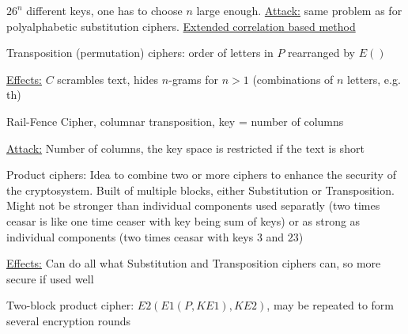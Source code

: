 \documentclass[landscape, a4paper]{article}
\begin{document}
\begin{minipage}[t]{0.2\linewidth}
\begin{betterlist}
\begin{betterlist}
\begin{betterlist}
				\begin{betterlist}
					\item $26^n$ different keys, one has to choose $n$ large enough. \underline{Attack:} same problem as for polyalphabetic substitution ciphers. \underline{Extended correlation based method}
				\end{betterlist}
			\end{betterlist}
		\end{betterlist}
	\end{betterlist}
	\begin{betterlist}
		\item \alert{Transposition (permutation) ciphers:} order of letters in $P$ rearranged by $E()$
		\begin{betterlist}
			\item \underline{Effects:} $C$ scrambles text, hides \alert{$n$-grams} for $n > 1$ (combinations of $n$ letters, e.g. th)
		\end{betterlist}
		\begin{betterlist}
			\item \alert{Rail-Fence Cipher}, columnar transposition, \alert{key} = number of columns
			\begin{betterlist}
				\item \underline{Attack:} Number of columns, the key space is restricted if the text is short
			\end{betterlist}
		\end{betterlist}
	\end{betterlist}
	\begin{betterlist}
		\item \alert{Product ciphers:} Idea to combine two or more ciphers to enhance the security of the cryptosystem. Built of multiple blocks, either \alert{Substitution} or \alert{Transposition}. Might not be stronger than individual components used separatly (two times ceasar is like one time ceaser with key being sum of keys) or as strong as individual components (two times ceasar with keys $3$ and $23$)
		\begin{betterlist}
			\item \underline{Effects:} Can do all what Substitution and Transposition ciphers can, so more secure if used well
			\item \alert{Two-block product cipher:} $E2(E1(P, KE1), KE2)$, may be repeated to form several encryption rounds

\end{betterlist}
\end{betterlist}
\end{minipage}
\end{document}
